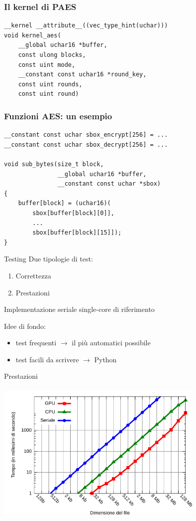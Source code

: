 \documentclass[11pt,xcolor=dvipsnames]{beamer}
\begin{document}
\begin{frame}[fragile]
\frametitle{Il kernel di PAES}
\begin{lstlisting}
__kernel __attribute__((vec_type_hint(uchar)))
void kernel_aes(
    __global uchar16 *buffer, 
    const ulong blocks, 
    const uint mode, 
    __constant const uchar16 *round_key, 
    const uint rounds, 
    const uint round)
\end{lstlisting}
\end{frame}

\begin{frame}[fragile]
\frametitle{Funzioni AES: un esempio}
\begin{lstlisting}
__constant const uchar sbox_encrypt[256] = ...
__constant const uchar sbox_decrypt[256] = ...

void sub_bytes(size_t block, 
               __global uchar16 *buffer, 
               __constant const uchar *sbox)
{
    buffer[block] = (uchar16)(
        sbox[buffer[block][0]], 
        ... 
        sbox[buffer[block][15]]);
}
\end{lstlisting}
\end{frame}


\begin{frame}{Testing}
Due tipologie di test:
\begin{enumerate}
\item Correttezza
\item Prestazioni
\end{enumerate}

\vspace{2mm}
\begin{center}
\begin{block}{}
\centering Implementazione seriale single-core di riferimento
\end{block}
\end{center}
Idee di fondo:
\begin{itemize}
\item test frequenti $\rightarrow$ il più automatici possibile
\item test facili da scrivere $\rightarrow$ Python
\end{itemize}
\end{frame}

\begin{frame}{Prestazioni}
\vspace{3mm}
\begin{center}
\includegraphics[height=7cm,width=10cm]{img/test-encrypt.pdf}
\end{center}
\end{frame}
\end{document}
